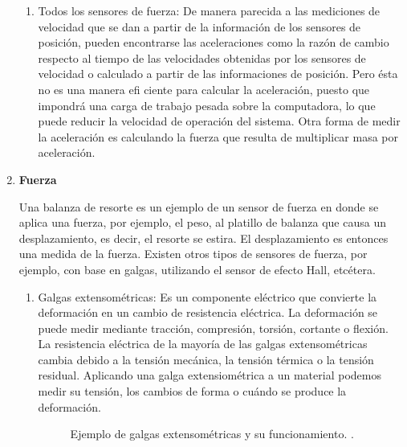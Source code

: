 \begin{enumerate}
			\begin{enumerate}
				\item Todos los sensores de fuerza: De manera parecida a las mediciones de velocidad que se dan a partir de la información de los sensores de posición, pueden encontrarse las aceleraciones como la razón de cambio respecto al tiempo de las velocidades obtenidas por los sensores de velocidad o calculado a partir de las informaciones de posición. Pero ésta no es una manera efi ciente para calcular la aceleración, puesto que impondrá una carga de trabajo pesada sobre la computadora, lo que puede reducir la velocidad de operación del sistema. Otra forma de medir la aceleración es calculando la fuerza que resulta de multiplicar masa por aceleración. \cite{saha2010robotics}\\
			\end{enumerate}
				\begin{figure}[h]
				\centering
				\hfill
			\end{figure}
			
			\item \textbf{Fuerza}
			
			Una balanza de resorte es un ejemplo de un sensor de fuerza en donde se aplica una fuerza, por ejemplo, el peso, al platillo de balanza que causa un desplazamiento, es decir, el resorte se estira. El desplazamiento es entonces una medida de la fuerza. Existen otros tipos de sensores de fuerza, por ejemplo, con base en galgas, utilizando el sensor de efecto Hall, etcétera. \cite{saha2010robotics}\\
			\begin{enumerate}
				\item Galgas extensométricas: Es un componente eléctrico que convierte la deformación en un cambio de resistencia eléctrica. La deformación se puede medir mediante tracción, compresión, torsión, cortante o flexión. La resistencia eléctrica de la mayoría de las galgas extensométricas cambia debido a la tensión mecánica, la tensión térmica o la tensión residual. Aplicando una galga extensiométrica a un material podemos medir su tensión, los cambios de forma o cuándo se produce la deformación. \cite{Galgas} \\
				
				\begin{figure}[h]
					\centering
					\hspace{0.5cm} %
					\caption{Ejemplo de galgas extensométricas y su funcionamiento. \cite{GalgasImagen}.}
					\label{fig:GalgasGeneral}
				\end{figure}
	

\end{enumerate}
\end{enumerate}

